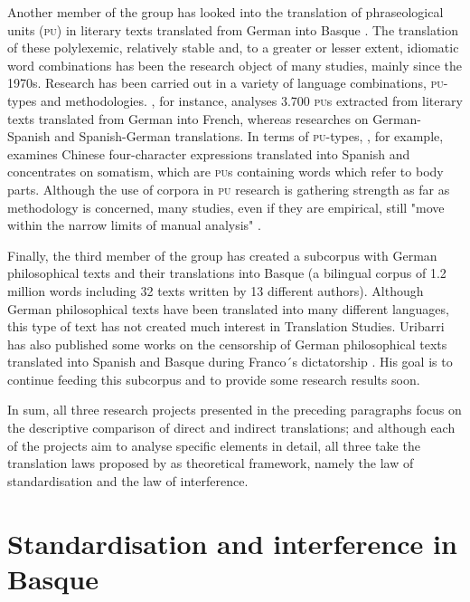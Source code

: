 \documentclass[output=paper]{LSP/langsci}
\begin{document}
Another member of the group has looked into the translation of phraseological units (\textsc{pu}) in literary texts translated from German into Basque \citep{Sanz2013}. The translation of these polylexemic, relatively stable and, to a greater or lesser extent, idiomatic word combinations has been the research object of many studies, mainly since the 1970s. Research has been carried out in a variety of language combinations, \textsc{pu}-types and methodologies. \citet{Higi1989}, for instance, analyses 3.700 \textsc{pu}s extracted from literary texts translated from German into French, whereas \citet{Segura1998} researches on German-Spanish and Spanish-German translations. In terms of \textsc{pu}-types, \citet{Ji2010}, for example, examines Chinese four-character expressions translated into Spanish and \citet{vanLawick2006} concentrates on somatism, which are \textsc{pu}s containing words which refer to body parts. Although the use of corpora in \textsc{pu} research is gathering strength as far as methodology is concerned, many studies, even if they are empirical, still "move within the narrow limits of manual analysis" \citep[843]{Marco2009}.

Finally, the third member of the group has created a subcorpus with German philosophical texts and their translations into Basque (a bilingual corpus of 1.2 million words including 32 texts written by 13 different authors). Although German philosophical texts have been translated into many different languages, this type of text has not created much interest in Translation Studies. Uribarri has also published some works on the censorship of German philosophical texts translated into Spanish and Basque during Franco´s dictatorship \citep{Uribarri2008,Uribarri2010}. His goal is to continue feeding this subcorpus and to provide some research results soon.

In sum, all three research projects presented in the preceding paragraphs focus on the descriptive comparison of direct and indirect translations; and although each of the projects aim to analyse specific elements in detail, all three take the translation laws proposed by  \citet{Toury2012} as theoretical framework, namely the law of standardisation and the law of interference.

\section{Standardisation and interference in Basque}
\end{document}
